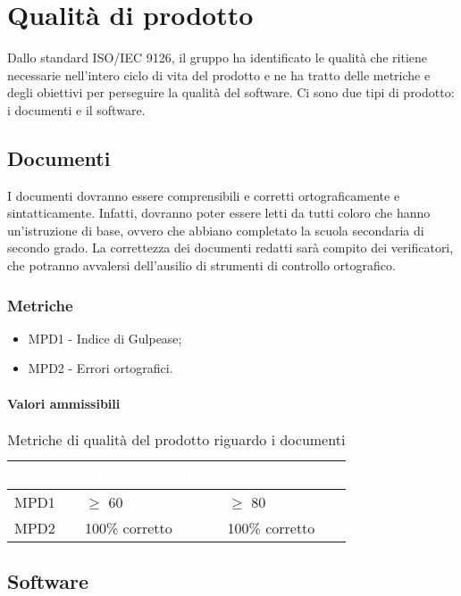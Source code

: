 \section{Qualità di prodotto}
Dallo standard ISO/IEC 9126, il gruppo \Gruppo{} ha identificato le qualità che ritiene necessarie nell'intero ciclo di vita del prodotto e ne ha tratto delle metriche e degli obiettivi per perseguire la qualità del software. Ci sono due tipi di prodotto: i documenti e il software.

\subsection{Documenti}
I documenti dovranno essere comprensibili e corretti ortograficamente e sintatticamente. Infatti, dovranno poter essere letti da tutti coloro che hanno un'istruzione di base, ovvero che abbiano completato la scuola secondaria di secondo grado. La correttezza dei documenti redatti sarà compito dei verificatori, che potranno avvalersi dell'ausilio di strumenti di controllo ortografico. 

\subsubsection{Metriche}
\begin{itemize}
\item MPD1 - Indice di Gulpease;
\item MPD2 - Errori ortografici.
\end{itemize} 
\paragraph{Valori ammissibili}
\renewcommand{\arraystretch}{1.5}
\begin{longtable}{C{2.5cm} C{4cm} C{4cm}}
\textcolor{white}{\textbf{Metrica}}&
\textcolor{white}{\textbf{Valore accettabile}}&
\textcolor{white}{\textbf{Valore ottimale}}\\	
\endhead
\endfoot
{}\caption{Metriche di qualità del prodotto riguardo i documenti}
\endlastfoot
		MPD1 &  
		$\geq$ 60 & 
		$\geq$ 80\\
		MPD2 & 
		100\% corretto & 
		100\% corretto \\
\end{longtable}
\subsection{Software}
